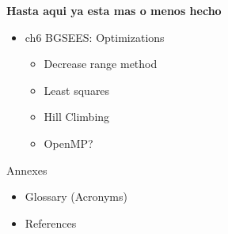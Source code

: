\textbf{Hasta aqui ya esta mas o menos hecho}

\begin{itemize}
	\item ch6 BGSEES: Optimizations
	\begin{itemize}
		\item Decrease range method
		\item Least squares
		\item Hill Climbing
		\item OpenMP?
	\end{itemize}
\end{itemize}

Annexes

\begin{itemize}
	\item Glossary (Acronyms)
	\item References
\end{itemize}


